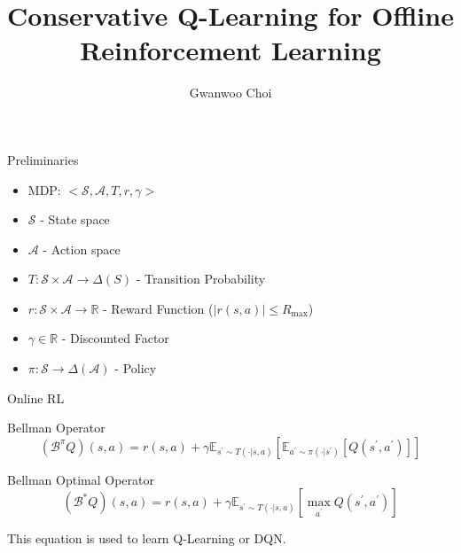 \documentclass[11pt]{beamer}
\title{Conservative Q-Learning for Offline Reinforcement Learning}
\author{Gwanwoo Choi}
\newcommand{\mbb}[1]{\mathbb{#1}}
\newcommand{\mc}[1]{\mathcal{#1}}
\newcommand{\abs}[1]{\left\lvert #1 \right\rvert}
\begin{document}

\begin{frame}
    \titlepage
\end{frame}





\begin{frame}{Preliminaries}
  \begin{itemize}
    \item MDP: $<\mc{S}, \mc{A},T, r, \gamma>$
    \item $\mc{S}$ - State space
    \item $\mc{A}$ - Action space
    \item $T: \mc{S}\times \mc{A} \to \Delta(S)$ - Transition Probability
    \item $r: \mc{S} \times \mc{A} \to \mbb{R}$ - Reward Function ($\abs{r(s,a)} \leq R_{\text{max}}$)
    \item $\gamma \in \mbb{R}$ - Discounted Factor
    \item $\pi : \mc{S} \to \Delta(\mc{A})$ - Policy
  \end{itemize}
\end{frame}


\begin{frame}{Online RL}
  \begin{block}{Bellman Operator}
    \[
      (\mc{B}^\pi Q)(s,a) = r(s,a) + \gamma \mbb{E}_{s^\prime \sim T(\cdot |s,a)}[\mbb{E}_{a^\prime \sim \pi(\cdot | s^\prime)}[Q(s^\prime, a^\prime)]] 
    \]
  \end{block}

  \begin{block}{Bellman Optimal Operator}
    \[
      (\mc{B}^\ast Q)(s,a) = r(s,a) + \gamma \mbb{E}_{s^\prime \sim T(\cdot |s,a)}[\max_{a^\prime} Q(s^\prime,a^\prime)]
    \]
  \end{block}
  This equation is used to learn Q-Learning or DQN.
\end{frame}
\end{document}
